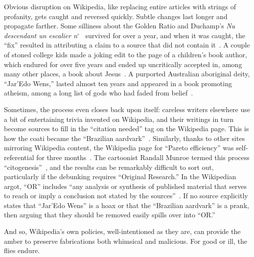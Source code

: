 \documentclass[aps,pra,superscriptaddress,12pt,tightenlines,nofootinbib]{revtex4-2}
\newcommand{\booktitle}{\textsl}
\begin{document}
Obvious disruption on Wikipedia, like replacing entire articles with
strings of profanity, gets caught and reversed quickly.  Subtle
changes last longer and propagate farther.  Some silliness about the
Golden Ratio and Duchamp's \booktitle{Nu descendant un escalier
  n$^\circ$~} survived for over a year, and when it was caught, the
``fix'' resulted in attributing a claim to a source that did not
contain it~\cite{sunclipse-duchamp}.  A couple of stoned college kids
made a joking edit to the page of a children's book author, which
endured for over five years and ended up uncritically accepted in,
among many other places, a book about Jesus~\cite{Dickson2014}.  A
purported Australian aboriginal deity, ``Jar'Edo Wens,'' lasted almost
ten years and appeared in a book promoting atheism, among a long list
of gods who had faded from belief~\cite{Dewey2015}.

Sometimes, the process even closes back upon itself: careless writers
elsewhere use a bit of entertaining trivia invented on Wikipedia, and
their writings in turn become sources to fill in the ``citation
needed'' tag on the Wikipedia page.  This is how the coati became the
``Brazilian aardvark''~\cite{Randall2014}.  Similarly, thanks to other
sites mirroring Wikipedia content, the Wikipedia page for ``Pareto
efficiency'' was self-referential for three months~\cite{Granade2014}.
The cartoonist Randall Munroe termed this process
``citogenesis''~\cite{Munroe2011}, and the results can be remarkably
difficult to sort out, particularly if the debunking requires
``Original Research.'' In the Wikipedian argot, ``OR'' includes ``any
analysis or synthesis of published material that serves to reach or
imply a conclusion not stated by the sources''~\cite{WPNOR}.  If no
source explicitly states that ``Jar'Edo Wens'' is a hoax or that the
``Brazilian aardvark'' is a prank, then arguing that they should be
removed easily spills over into ``OR.''

And so, Wikipedia's own policies, well-intentioned as they are, can
provide the amber to preserve fabrications both whimsical and
malicious.  For good or ill, the flies endure.
\end{document}
